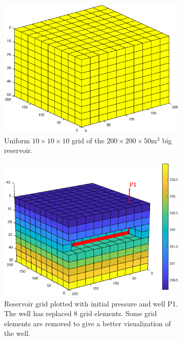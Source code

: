 \begin{figure}[htbp]
    \centering
    \begin{subfigure}[t]{0.48\textwidth}
        \centering
        \includegraphics[width = \textwidth]{figures/flowSolver_grid.eps}
        \caption{Uniform $10\times 10 \times 10$ grid of the $200\times 200 \times 50 \text{m}^3$ big reservoir.}
        \label{fig:flowSolverGrid}
    \end{subfigure}
    \hfill
    \begin{subfigure}[t]{0.48\textwidth}
        \centering
        \includegraphics[width = \textwidth]{figures/flowSolver_gridWithWell.eps}
        \caption{Reservoir grid plotted with initial pressure and well P1. The well has replaced 8 grid elements. Some grid elements are removed to give a better visualization of the well.}
        \label{fig:flowSolverGridWithWell}
    \end{subfigure}
    \caption{}
\end{figure}


